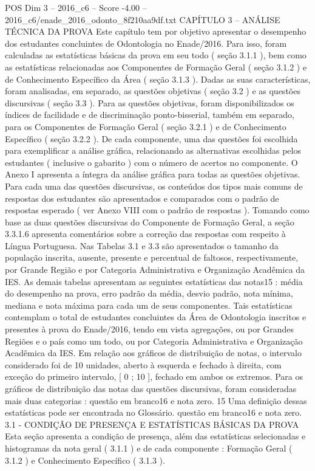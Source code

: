 \begin{textsample}{POS Dim 3 – 2016\_c6 – Score -4.00 – 2016\_c6/enade\_2016\_odonto\_8f210aa9df.txt}  \label{ex:f3_pos_247}
CAPÍTULO 3 – ANÁLISE TÉCNICA DA PROVA Este capítulo tem por objetivo apresentar o desempenho dos estudantes concluintes de Odontologia no Enade/2016.
Para isso, foram calculadas as estatísticas básicas da prova em seu todo ( seção 3.1.1 ), bem como as estatísticas relacionadas aos Componentes de Formação Geral ( seção 3.1.2 ) e de Conhecimento Específico da Área ( seção 3.1.3 ).
Dadas as suas características, foram analisadas, em separado, as questões objetivas ( seção 3.2 ) e as questões discursivas ( seção 3.3 ).
Para as questões objetivas, foram disponibilizados os índices de facilidade e de discriminação ponto-bisserial, também em separado, para os Componentes de Formação Geral ( seção 3.2.1 ) e de Conhecimento Específico ( seção 3.2.2 ).
De cada componente, uma das questões foi escolhida para exemplificar a análise gráfica, relacionando as alternativas escolhidas pelos estudantes ( inclusive o gabarito ) com o número de acertos no componente.
O Anexo I apresenta a íntegra da análise gráfica para todas as questões objetivas.
Para cada uma das questões discursivas, os conteúdos dos tipos mais comuns de respostas dos estudantes são apresentados e comparados com o padrão de respostas esperado ( ver Anexo VIII com o padrão de respostas ).
Tomando como base as duas questões discursivas do Componente de Formação Geral, a seção 3.3.1.6 apresenta comentários sobre a correção das respostas com respeito à Língua Portuguesa.
Nas Tabelas 3.1 e 3.3 são apresentados o tamanho da população inscrita, ausente, presente e percentual de faltosos, respectivamente, por Grande Região e por Categoria Administrativa e Organização Acadêmica da IES.
As demais tabelas apresentam as seguintes estatísticas das notas15 : média do desempenho na prova, erro padrão da média, desvio padrão, nota mínima, mediana e nota máxima para cada um de seus componentes.
Tais estatísticas contemplam o total de estudantes concluintes da Área de Odontologia inscritos e presentes à prova do Enade/2016, tendo em vista agregações, ou por Grandes Regiões e o país como um todo, ou por Categoria Administrativa e Organização Acadêmica da IES.
Em relação aos gráficos de distribuição de notas, o intervalo considerado foi de 10 unidades, aberto à esquerda e fechado à direita, com exceção do primeiro intervalo, [ 0 ; 10 ], fechado em ambos os extremos.
Para os gráficos de distribuição das notas das questões discursivas, foram consideradas mais duas categorias : questão em branco16 e nota zero. 15 Uma definição dessas estatísticas pode ser encontrada no Glossário. questão em branco16 e nota zero. 3.1 - CONDIÇÃO DE PRESENÇA E ESTATÍSTICAS BÁSICAS DA PROVA Esta seção apresenta a condição de presença, além das estatísticas selecionadas e histogramas da nota geral ( 3.1.1 ) e de cada componente : Formação Geral ( 3.1.2 ) e Conhecimento Específico ( 3.1.3 ).

\end{textsample}
